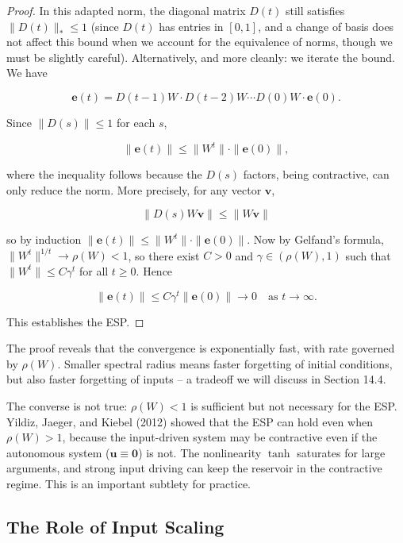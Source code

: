 \begin{proof}
In this adapted norm, the diagonal matrix $D(t)$ still satisfies $\|D(t)\|_* \leq 1$ (since $D(t)$ has entries in $[0,1]$, and a change of basis does not affect this bound when we account for the equivalence of norms, though we must be slightly careful). Alternatively, and more cleanly: we iterate the bound. We have

\[
\mathbf{e}(t) = D(t-1)W \cdot D(t-2)W \cdots D(0)W \cdot \mathbf{e}(0).
\]

Since $\|D(s)\| \leq 1$ for each $s$,

\[
\|\mathbf{e}(t)\| \leq \|W^t\| \cdot \|\mathbf{e}(0)\|,
\]

where the inequality follows because the $D(s)$ factors, being contractive, can only reduce the norm. More precisely, for any vector $\mathbf{v}$,

\[
\|D(s) W \mathbf{v}\| \leq \|W\mathbf{v}\|
\]

so by induction $\|\mathbf{e}(t)\| \leq \|W^t\| \cdot \|\mathbf{e}(0)\|$. Now by Gelfand's formula, $\|W^t\|^{1/t} \to \rho(W) < 1$, so there exist $C > 0$ and $\gamma \in (\rho(W), 1)$ such that $\|W^t\| \leq C \gamma^t$ for all $t \geq 0$. Hence

\[
\|\mathbf{e}(t)\| \leq C \gamma^t \|\mathbf{e}(0)\| \to 0 \quad \text{as } t \to \infty.
\]

This establishes the ESP.
\end{proof}


\begin{remark}
The proof reveals that the convergence is exponentially fast, with rate governed by $\rho(W)$. Smaller spectral radius means faster forgetting of initial conditions, but also faster forgetting of inputs -- a tradeoff we will discuss in Section 14.4.
\end{remark}


\begin{remark}
The converse is not true: $\rho(W) < 1$ is sufficient but not necessary for the ESP. Yildiz, Jaeger, and Kiebel (2012) showed that the ESP can hold even when $\rho(W) > 1$, because the input-driven system may be contractive even if the autonomous system ($\mathbf{u} \equiv \mathbf{0}$) is not. The nonlinearity $\tanh$ saturates for large arguments, and strong input driving can keep the reservoir in the contractive regime. This is an important subtlety for practice.
\end{remark}


\subsection{The Role of Input Scaling}\label{sec:14.3.2}

